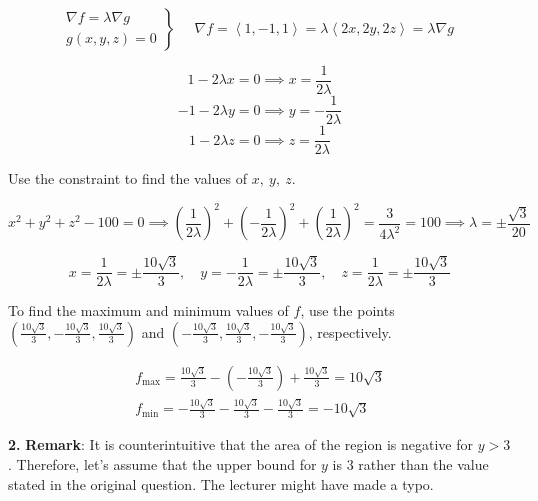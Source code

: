 \documentclass{article}
\begin{document}
\[
\left.
\begin{array}{l}
\displaystyle\nabla f=\lambda\nabla g \\
\displaystyle g(x,y,z)=0
\end{array}
\right\}\quad
\begin{array}{c}
\nabla f=\left\langle1,-1,1\right\rangle=\lambda\left\langle2x,2y,2z\right\rangle=\lambda\nabla g
\end{array}
\]

\[1-2\lambda x=0\implies x=\frac1{2\lambda}\]
\[-1-2\lambda y=0\implies y=-\frac1{2\lambda}\]
\[1-2\lambda z=0\implies z=\frac1{2\lambda}\]

Use the constraint to find the values of $x,\:y,\:z$.

\[x^2+y^2+z^2-100=0\implies\left(\frac1{2\lambda}\right)^2+\left(-\frac1{2\lambda}\right)^2+\left(\frac1{2\lambda}\right)^2=\frac3{4\lambda^2}=100\implies\lambda=\pm\frac{\sqrt3}{20}\]

\[x=\frac1{2\lambda}=\pm\frac{10\sqrt3}3,\quad y=-\frac1{2\lambda}=\pm\frac{10\sqrt3}3,\quad z=\frac1{2\lambda}=\pm\frac{10\sqrt3}3\]

To find the maximum and minimum values of $f$, use the points $\left(\frac{10\sqrt3}3,-\frac{10\sqrt3}3,\frac{10\sqrt3}3\right)$ and $\left(-\frac{10\sqrt3}3,\frac{10\sqrt3}3,-\frac{10\sqrt3}3\right)$, respectively.

\[
\boxed{\begin{array}{c}
\displaystyle f_{\text{max}}=\frac{10\sqrt3}3-\left(-\frac{10\sqrt3}3\right)+\frac{10\sqrt3}3=10\sqrt3\\
\displaystyle f_{\text{min}}=-\frac{10\sqrt3}3-\frac{10\sqrt3}3-\frac{10\sqrt3}3=-10\sqrt3\end{array}}
\]

\vspace{1em}

\textbf{2.} \textbf{Remark}: It is counterintuitive that the area of the region is negative for $y>3$. Therefore, let's assume that the upper bound for $y$ is $3$ rather than the value stated in the original question. The lecturer might have made a typo.
\end{document}
